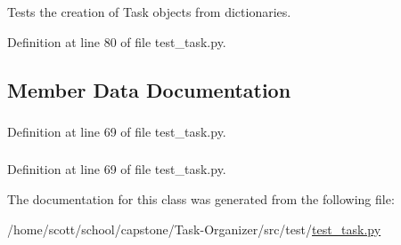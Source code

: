 \-Tests the creation of \-Task objects from dictionaries. 



\-Definition at line 80 of file test\-\_\-task.\-py.



\subsection{\-Member \-Data \-Documentation}
\hypertarget{classtest__task_1_1TestTaskCreator_aafdbd8cf36b40657079ce5f73804982c}{
\subsubsection[{notes}]{}}
\label{classtest__task_1_1TestTaskCreator_aafdbd8cf36b40657079ce5f73804982c}


\-Definition at line 69 of file test\-\_\-task.\-py.

\hypertarget{classtest__task_1_1TestTaskCreator_a9c55dbe4857c75991a7ad6dd649e6f73}{
\subsubsection[{title}]{}}
\label{classtest__task_1_1TestTaskCreator_a9c55dbe4857c75991a7ad6dd649e6f73}


\-Definition at line 69 of file test\-\_\-task.\-py.



\-The documentation for this class was generated from the following file\-:\begin{DoxyCompactItemize}
\item 
/home/scott/school/capstone/\-Task-\/\-Organizer/src/test/\hyperlink{test__task_8py}{test\-\_\-task.\-py}\end{DoxyCompactItemize}
